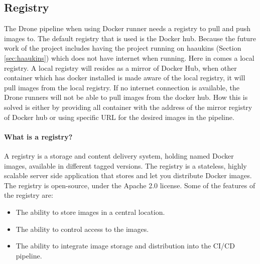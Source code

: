 \subsection{Registry}
\label{sec:registry}
The Drone pipeline when using Docker runner needs a registry to pull and push images to.
The default registry that is used is the Docker hub. Because the future work of the project includes
having the project running on haaukins (Section \ref{sec:haaukins}) which does not have internet when running.
Here in comes a local registry. A local registry will resides as a mirror of Docker Hub, when 
other container which has docker installed is made aware of the local registry, it will pull images from the local registry.
If no internet connection is available, the Drone runners will not be able to pull images from the docker hub. 
How this is solved is either by providing all container with the address of the mirror registry of Docker hub or 
using specific \ac{URL} for the desired images in the pipeline.\\
\paragraph{What is a registry?}
A registry is a storage and content delivery system, holding named Docker images, available in different tagged versions.
The registry is a stateless, highly scalable server side application that stores and let you distribute Docker images.
The registry is open-source, under the Apache 2.0 license. Some of the features of the registry are:

\begin{itemize}
    \item The ability to store images in a central location.
    \item The ability to control access to the images.
    \item The ability to integrate image storage and distribution into the \ac{CI/CD} pipeline.
\end{itemize}

\newpage